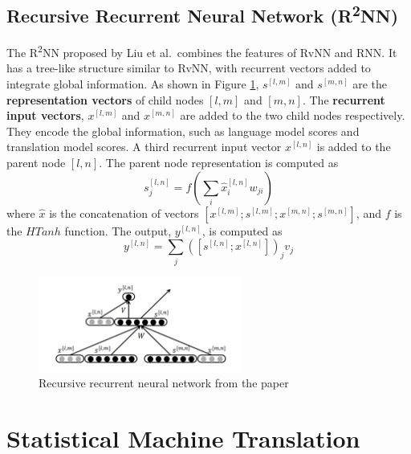 \documentclass[12pt,a4paper,twoside]{report}
\begin{document}
\subsection{\texorpdfstring{Recursive Recurrent Neural Network (R\textsuperscript{2}NN)}{Recursive Recurrent Neural Network (R2NN)}}\label{section:r2nn_theory}

The R\textsuperscript{2}NN proposed by Liu et al.~combines the features of RvNN and RNN. It has a tree-like structure similar to RvNN, with recurrent vectors added to integrate global information. As shown in Figure \ref{fig:r2nn}, $s^{[l, m]}$ and $s^{[m, n]}$ are the \textbf{representation vectors} of child nodes $[l, m]$ and $[m, n]$. The \textbf{recurrent input vectors}, $x^{[l, m]}$ and $x^{[m, n]}$ are added to the two child nodes respectively. They encode the global information, such as language model scores and translation model scores. A third recurrent input vector $x^{[l, n]}$ is added to the parent node $[l, n]$. The parent node representation is computed as
\[ s_j^{[l, n]} = f(\sum_{i} \hat{x}_i^{[l, n]}w_{ji}) \]
where $\hat{x}$ is the concatenation of vectors $[x^{[l, m]}; s^{[l, m]}; x^{[m, n]}; s^{[m, n]}]$, and $f$ is the $HTanh$ function. The output, $y^{[l, n]}$, is computed as
\[ y^{[l, n]} = \sum_{j} ([s^{[l, n]}; x^{[l, n]}])_{j}v_j \]

\begin{figure}[ht]
\centering
\includegraphics[width=0.6\textwidth]{images/r2nn.png}
\caption{Recursive recurrent neural network from the paper~\cite{r2nn}}
\label{fig:r2nn}
\end{figure}

\section{Statistical Machine Translation}
\end{document}
